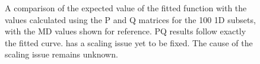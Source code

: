 \documentclass[twoside,senior]{BYUPhys}
\begin{document}
\begin{figure}[ht!]
 \centering
 
 \quad
 \caption[Comparison of the PQ matrices with the expected result for \textlangle{}100\textrangle{} 1D subset.]{\label{appfig:100PQ} A comparison of the expected value of the fitted function with the values calculated using the P and Q matrices for the \textlangle{}100\textrangle{} 1D subsets, with the MD values shown for reference.  \protect{} PQ results follow exactly the fitted curve.  \protect{} has a scaling issue yet to be fixed.  The cause of the scaling issue remains unknown.}
\end{figure}
\end{document}
